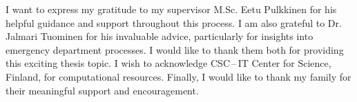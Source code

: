 I want to express my gratitude to my supervisor M.Sc. Eetu Pulkkinen for his helpful guidance and support throughout this process.
I am also grateful to Dr. Jalmari Tuominen for his invaluable advice, particularly for insights into emergency department processes.
I would like to thank them both for providing this exciting thesis topic.
I wish to acknowledge CSC\,--\,IT Center for Science, Finland, for computational resources. Finally, I would like to thank my family for their meaningful support and encouragement.